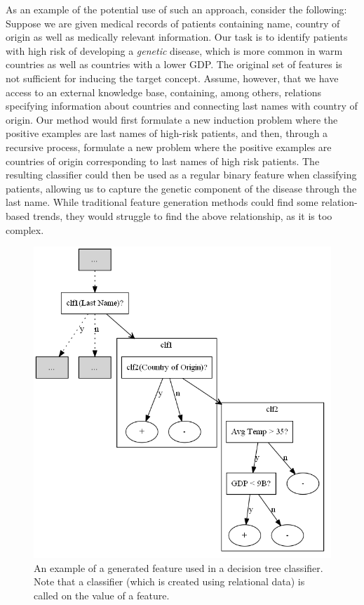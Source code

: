 \documentclass{article}
\theoremstyle{definition}
\begin{document}
As an example of the potential use of such an approach, consider the following:
Suppose we are given medical records of patients containing name, country of origin as well as medically relevant information.
Our task is to identify patients with high risk of developing a \emph{genetic} disease, which is more common in warm countries as well as countries with a lower GDP.
The original set of features is not sufficient for inducing the target concept.  Assume, however, that we have access to an external knowledge base, containing, among others, relations specifying information about countries and connecting last names with country of origin.
Our method would first formulate a new induction problem where the positive examples are last names of high-risk patients, and then, through a recursive process, formulate a new problem where the positive examples are countries of origin corresponding to last names of high risk patients. The resulting classifier could then be used as a regular binary feature when classifying patients, allowing us to capture the genetic component of the disease through the last name. While traditional feature generation methods could find some relation-based trends, they would struggle to find the above relationship, as it is too complex.

\begin{figure}[H]
	\centering
	\includegraphics[scale=0.3, keepaspectratio=true]{output.png}
	\caption{An example of a generated feature used in a decision tree classifier. Note that a classifier (which is created using relational data) is called on the value of a feature.}
	\label{fig:example}
\end{figure}
\end{document}
